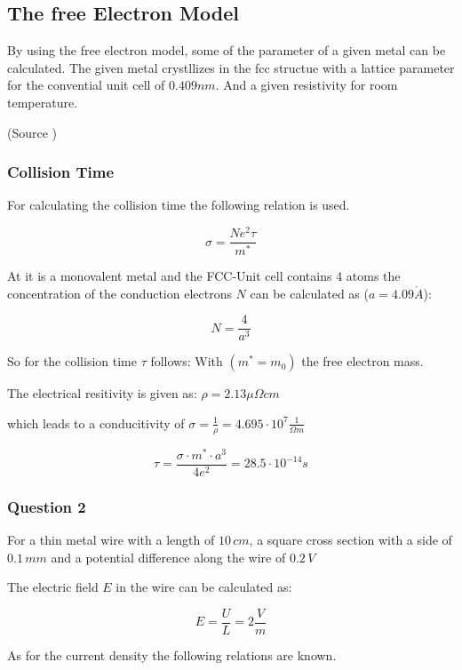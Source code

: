 \subsection{The free Electron Model} \label{chap1}

By using the free electron model, some of the parameter
of a given metal can be calculated. The given metal
crystllizes in the fcc structue with a lattice parameter 
for the convential unit cell of $0.409nm$. And a given 
resistivity for room temperature.

(Source \cite[Elementary Solid State Physics Chapter 4]{elementary_SSP})

\subsubsection*{Collision Time}

For calculating the collision time the following relation
is used.

\begin{equation}
    \sigma = \frac{N e^2 \tau}{m^*}
\end{equation}


At it is a monovalent metal and the FCC-Unit cell contains 
4 atoms the concentration of the conduction electrons $N$ can be
calculated as ($a = 4.09 \mathring{A}$):

$$N =\frac{4}{a^3}$$

So for the collision time $\tau$ follows:
With $(m^* = m_0)$ the free electron mass.

The electrical resitivity is given as:
$\rho = 2.13 \mu \Omega cm$

which leads to a conducitivity of
$\sigma = \frac{1}{\rho} = 4.695\cdot 10^7 \frac{1}{\Omega m}$


$$\tau =\frac{\sigma \cdot m^* \cdot a^3}{4e^2} = 28.5 \cdot 10^{-14}s$$

\subsubsection*{Question 2}

For a thin metal wire with a length of $10 \, cm$, a square cross section with 
a side of $0.1 \, mm$ and a potential difference along the wire of $0.2 \, V$

The electric field $E$ in the wire can be calculated as: 

$$E = \frac{U}{L} = 2 \frac{V}{m}$$

As for the current density the following relations are known.

